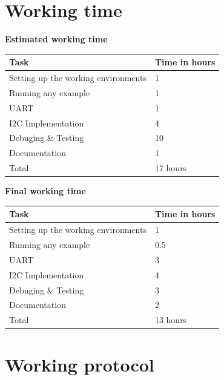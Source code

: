 \documentclass[12pt]{article}
\begin{document}
\section{Working time}
\begin{center}
\textbf{Estimated working time}
\end{center}
\begin{table}[h]
\begin{tabular}{|p{}|p{}|}
\hline
\textbf{Task}                                              & \textbf{Time in hours                              } \\ \hline \hline
Setting up the working environments &  1  \\ \hline 
Running any example &  1  \\ \hline 
UART &  1  \\ \hline 
I2C Implementation &  4  \\ \hline 
Debuging \& Testing &  10  \\ \hline 
Documentation &  1  \\ \hline 
\hline
Total &  17 hours \\ \hline 
\end{tabular}
\end{table}
\begin{center}
\textbf{Final working time}
\end{center}
\begin{table}[h]
\begin{tabular}{|p{}|p{}|}
\hline
\textbf{Task}                                              & \textbf{Time in hours                              } \\ \hline \hline
Setting up the working environments &  1  \\ \hline 
Running any example &  0.5  \\ \hline 
UART &  3  \\ \hline 
I2C Implementation &  4 \\ \hline 
Debuging \& Testing & 3  \\ \hline 
Documentation &  2  \\ \hline 
\hline
Total &  13 hours \\ \hline 
\end{tabular}
\end{table}


\section{Working protocol}
\end{document}
